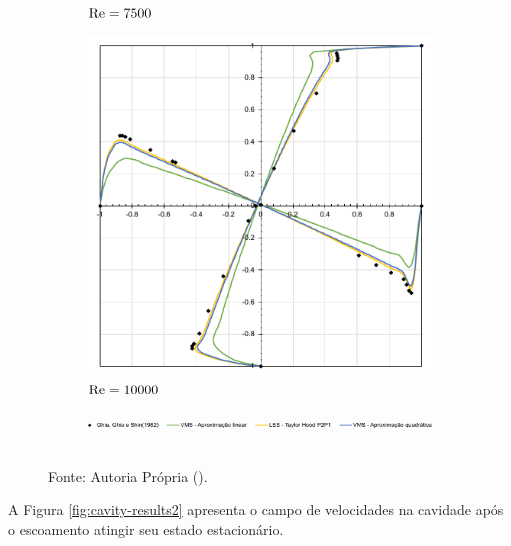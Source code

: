 \begin{figure}[h]
\begin{subfigure}{0.4\textwidth}
    \caption{$\mathrm{Re}=7500$}
    \end{subfigure}
    \begin{subfigure}{0.4\textwidth}
    \includegraphics[width=\linewidth]{Figuras/Cavity/Re10000.pdf}
    \caption{$\mathrm{Re}=10000$}
    \end{subfigure}
    \begin{subfigure}{\textwidth}
    \includegraphics[width=\linewidth]{Figuras/Cavity/Legenda.pdf}
    \end{subfigure}
    \\Fonte: Autoria Própria (\the\year).
    \label{fig:cavity-results}
\end{figure}

A Figura \ref{fig:cavity-results2} apresenta o campo de velocidades na cavidade após o escoamento atingir seu estado estacionário.

